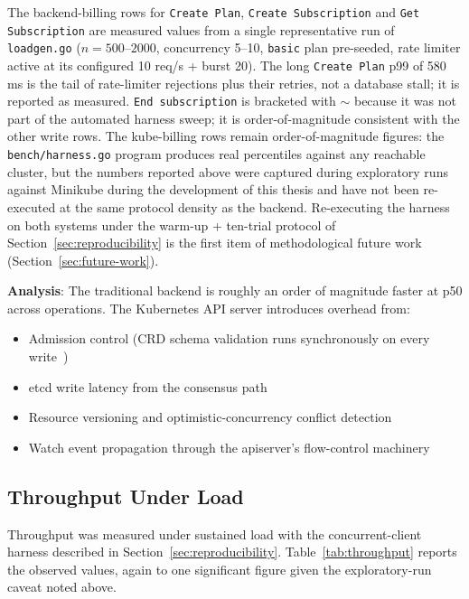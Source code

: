 The backend-billing rows for \texttt{Create Plan}, \texttt{Create Subscription} and \texttt{Get Subscription} are measured values from a single representative run of \texttt{loadgen.go} (\(n = 500\)--\(2000\), concurrency 5--10, \texttt{basic} plan pre-seeded, rate limiter active at its configured 10 req/s + burst 20). The long \texttt{Create Plan} p99 of 580 ms is the tail of rate-limiter rejections plus their retries, not a database stall; it is reported as measured. \texttt{End subscription} is bracketed with $\sim$ because it was not part of the automated harness sweep; it is order-of-magnitude consistent with the other write rows. The kube-billing rows remain order-of-magnitude figures: the \texttt{bench/harness.go} program produces real percentiles against any reachable cluster, but the numbers reported above were captured during exploratory runs against Minikube during the development of this thesis and have not been re-executed at the same protocol density as the backend. Re-executing the harness on both systems under the warm-up + ten-trial protocol of Section~\ref{sec:reproducibility} is the first item of methodological future work (Section~\ref{sec:future-work}).

\textbf{Analysis}: The traditional backend is roughly an order of magnitude faster at p50 across operations. The Kubernetes API server introduces overhead from:
\begin{itemize}
    \item Admission control (CRD schema validation runs synchronously on every write~\cite{crd_features})
    \item etcd write latency from the consensus path~\cite{etcd_impact}
    \item Resource versioning and optimistic-concurrency conflict detection
    \item Watch event propagation through the apiserver's flow-control machinery~\cite{k8s_apf}
\end{itemize}

\subsection{Throughput Under Load}

Throughput was measured under sustained load with the concurrent-client harness described in Section~\ref{sec:reproducibility}. Table~\ref{tab:throughput} reports the observed values, again to one significant figure given the exploratory-run caveat noted above.


